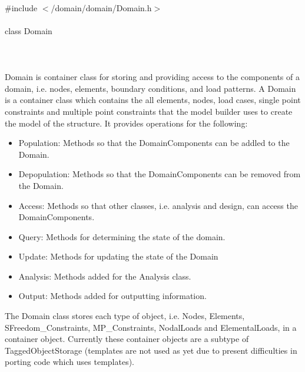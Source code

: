 
   \\
\indent \#include $<$/domain/domain/Domain.h$>$  \\

  \\
\indent class Domain  \\

 \\
 \\

  \\
\indent Domain is container class for storing and providing access to
the components of a domain, i.e. nodes, elements, boundary conditions,
and load patterns. 
A Domain is a container class which contains the  all elements,
nodes, load cases, single point constraints and multiple point
constraints that the model builder uses to create the model of the
structure. It provides operations for the following: 
\begin{itemize}
\item Population: Methods so that the DomainComponents can be addled
to the Domain. 
\item Depopulation: Methods so that the DomainComponents can be removed
from the Domain.
\item Access: Methods so that other classes, i.e. analysis and design,
can access the DomainComponents.
\item Query: Methods for determining the state of the domain.
\item Update: Methods for updating the state of the Domain
\item Analysis: Methods added for the Analysis class.
\item Output: Methods added for outputting information.
\end{itemize}
The Domain class stores each type of object, i.e. Nodes, Elements,
SFreedom\_Constraints, MP\_Constraints, NodalLoads and ElementalLoads, in a
container object. Currently these container objects are a subtype of
TaggedObjectStorage (templates are not used as yet due to present
difficulties in porting code which uses templates). \\

